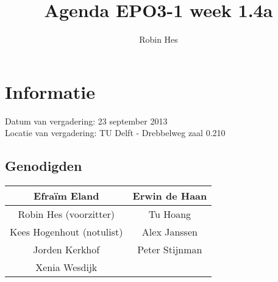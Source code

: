 \documentclass{article}
\begin{document}
\title{Agenda EPO3-1 week 1.4a}%
\author{Robin Hes}%
\maketitle

\section*{Informatie}
Datum van vergadering: 23 september 2013\\ %
Locatie van vergadering: TU Delft - Drebbelweg zaal 0.210 %
\subsection*{Genodigden}
\begin{center}
\begin{tabular}{|c |c |}
	\hline
	Efraïm Eland & Erwin de Haan \\
	\hline
	Robin Hes (voorzitter) & Tu Hoang \\
	\hline
	Kees Hogenhout (notulist) & Alex Janssen\\
	\hline
	Jorden Kerkhof & Peter Stijnman \\
	\hline
	Xenia Wesdijk & \\
	\hline
\end{tabular}
\end{center}
\end{document}

